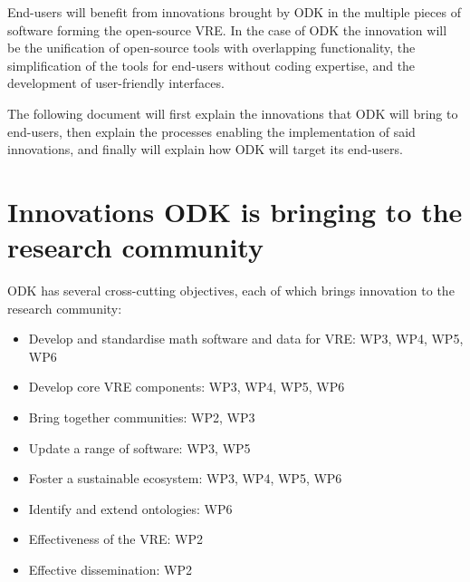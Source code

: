 \documentclass{deliverablereport}
\begin{document}
End-users will benefit from innovations brought by ODK in the
multiple pieces of software forming the open-source VRE. In the case of
ODK the innovation will be the unification of open-source
tools with overlapping functionality, the simplification of the tools
for end-users without coding expertise, and the development of
user-friendly interfaces.

The following document will first explain the innovations that
ODK will bring to end-users, then explain the processes
enabling the implementation of said innovations, and finally will
explain how ODK will target its end-users.


\section{Innovations ODK is bringing to the research community}

ODK has several cross-cutting objectives, each of which
brings innovation to the research community:
\begin{itemize}
\item{Develop and standardise math software and data for VRE: WP3, WP4, WP5, WP6}
\item{Develop core VRE components: WP3, WP4, WP5, WP6}
\item{Bring together communities: WP2, WP3}
\item{Update a range of software: WP3, WP5}
\item{Foster a sustainable ecosystem: WP3, WP4, WP5, WP6}
\item{Identify and extend ontologies: WP6}
\item{Effectiveness of the VRE: WP2}
\item{Effective dissemination: WP2}
\end{itemize}
\end{document}
